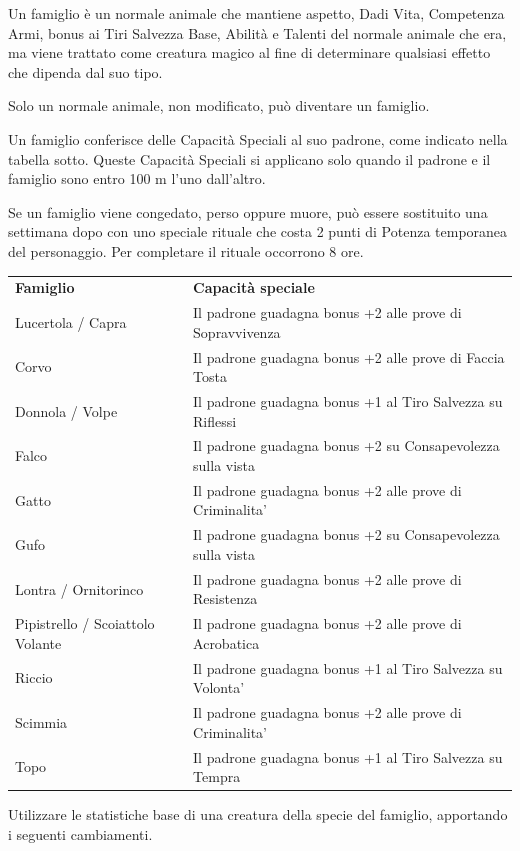 \documentclass[a4paper,11pt,twoside,openany]{book}
\begin{document}
Un famiglio è un normale animale che mantiene aspetto, Dadi Vita, Competenza Armi, bonus ai Tiri Salvezza Base, Abilità e Talenti del normale animale che era, ma viene trattato come creatura magico al fine di determinare qualsiasi effetto che dipenda dal suo tipo.

Solo un normale animale, non modificato, può diventare un famiglio.

Un famiglio conferisce delle Capacità Speciali al suo padrone, come indicato nella tabella sotto. Queste Capacità Speciali si applicano solo quando il padrone e il famiglio sono entro 100 m l'uno dall'altro.

Se un famiglio viene congedato, perso oppure muore, può essere sostituito una settimana dopo con uno speciale rituale che costa 2 punti di Potenza temporanea del personaggio. Per completare il rituale occorrono 8 ore.

\bigskip

\begin{tabularx}{\textwidth}{lX}
	\toprule
	\textbf{Famiglio}                & \textbf{Capacità speciale}\tabularnewline
	Lucertola / Capra                & Il padrone guadagna bonus +2 alle prove di Sopravvivenza\tabularnewline
	Corvo                            & Il padrone guadagna bonus +2 alle prove di Faccia Tosta\tabularnewline
	Donnola / Volpe                  & Il padrone guadagna bonus +1 al Tiro Salvezza su Riflessi\tabularnewline
	Falco                            & Il padrone guadagna bonus +2 su Consapevolezza sulla vista\tabularnewline
	Gatto                            & Il padrone guadagna bonus +2 alle prove di Criminalita'\tabularnewline
	Gufo                             & Il padrone guadagna bonus +2 su Consapevolezza sulla vista\tabularnewline
	Lontra / Ornitorinco             & Il padrone guadagna bonus +2 alle prove di Resistenza\tabularnewline
	Pipistrello / Scoiattolo Volante & Il padrone guadagna bonus +2 alle prove di Acrobatica\tabularnewline
	Riccio                           & Il padrone guadagna bonus +1 al Tiro Salvezza su Volonta'\tabularnewline
	Scimmia                          & Il padrone guadagna bonus +2 alle prove di Criminalita'\tabularnewline
	Topo                             & Il padrone guadagna bonus +1 al Tiro Salvezza su Tempra\tabularnewline
\end{tabularx}

\bigskip

Utilizzare le statistiche base di una creatura della specie del famiglio, apportando i seguenti cambiamenti.
\end{document}
